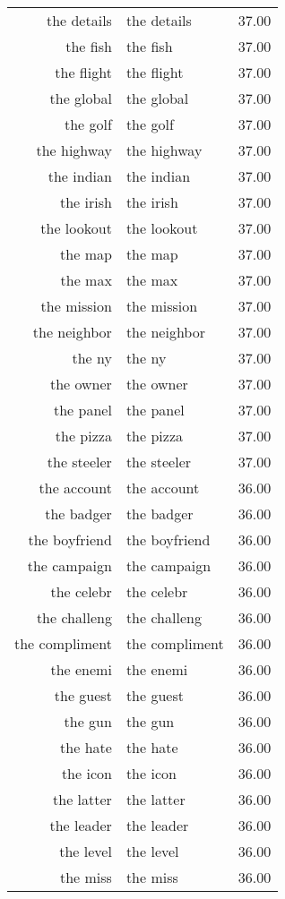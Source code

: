 \begin{table}[ht]
\begin{tabular}{rlr}
  the details & the details & 37.00 \\ 
  the fish & the fish & 37.00 \\ 
  the flight & the flight & 37.00 \\ 
  the global & the global & 37.00 \\ 
  the golf & the golf & 37.00 \\ 
  the highway & the highway & 37.00 \\ 
  the indian & the indian & 37.00 \\ 
  the irish & the irish & 37.00 \\ 
  the lookout & the lookout & 37.00 \\ 
  the map & the map & 37.00 \\ 
  the max & the max & 37.00 \\ 
  the mission & the mission & 37.00 \\ 
  the neighbor & the neighbor & 37.00 \\ 
  the ny & the ny & 37.00 \\ 
  the owner & the owner & 37.00 \\ 
  the panel & the panel & 37.00 \\ 
  the pizza & the pizza & 37.00 \\ 
  the steeler & the steeler & 37.00 \\ 
  the account & the account & 36.00 \\ 
  the badger & the badger & 36.00 \\ 
  the boyfriend & the boyfriend & 36.00 \\ 
  the campaign & the campaign & 36.00 \\ 
  the celebr & the celebr & 36.00 \\ 
  the challeng & the challeng & 36.00 \\ 
  the compliment & the compliment & 36.00 \\ 
  the enemi & the enemi & 36.00 \\ 
  the guest & the guest & 36.00 \\ 
  the gun & the gun & 36.00 \\ 
  the hate & the hate & 36.00 \\ 
  the icon & the icon & 36.00 \\ 
  the latter & the latter & 36.00 \\ 
  the leader & the leader & 36.00 \\ 
  the level & the level & 36.00 \\ 
  the miss & the miss & 36.00 \\ 

\end{tabular}
\end{table}
